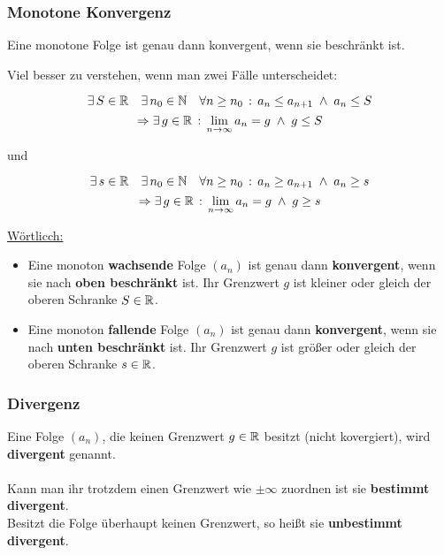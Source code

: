 \subsubsection{Monotone Konvergenz}


\begin{Theorem}
Eine monotone Folge ist genau dann konvergent, wenn sie beschränkt ist.
\end{Theorem}

\begin{Beweis}
\end{Beweis}

Viel besser zu verstehen, wenn man zwei Fälle unterscheidet:

\begin{Theorem}
$$\exists\, S\in\mathbb{R} \quad \exists \,n_0\in\mathbb{N} \quad \forall n\geq n_0\,:\, a_n\leq a_{n+1}\; \land \; a_n\leq S$$
$$\Rightarrow \exists\, g\in\mathbb{R} \,:\, \lim\limits_{n\to\infty}a_n=g\;\land\; g\leq S $$
 \begin{center}und\end{center}
$$\exists \, s\in\mathbb{R} \quad\exists \, n_0\in\mathbb{N} \quad \forall n\geq n_0\,:\, a_n\geq a_{n+1}\; \land \;a_n\geq s$$
$$\Rightarrow \exists \, g\in\mathbb{R} \,:\, \lim\limits_{n\to\infty}a_n=g\;\land\; g\geq s$$
\end{Theorem}

	\underline{Wörtlicch:}
\begin{itemize}
\item Eine monoton \textbf{wachsende} Folge $(a_n)$ ist genau dann \textbf{konvergent}, wenn sie nach \textbf{oben beschränkt} ist. Ihr Grenzwert $g$ ist kleiner oder gleich der oberen Schranke $S\in\mathbb{R}$.
\item  Eine monoton \textbf{fallende} Folge $(a_n)$ ist genau dann \textbf{konvergent}, wenn sie nach \textbf{unten beschränkt} ist. Ihr Grenzwert $g$ ist größer oder gleich der oberen Schranke $s\in\mathbb{R}$.
\end{itemize}

\subsubsection{Divergenz}
\begin{Definition}
Eine Folge $(a_n)$, die keinen Grenzwert $g\in\mathbb{R}$ besitzt (nicht kovergiert), wird \textbf{divergent} genannt.\\\\
Kann man ihr trotzdem einen Grenzwert wie $\pm\infty$ zuordnen ist sie \textbf{bestimmt divergent}.\\
Besitzt die Folge überhaupt keinen Grenzwert, so heißt sie \textbf{unbestimmt divergent}.
\end{Definition}

